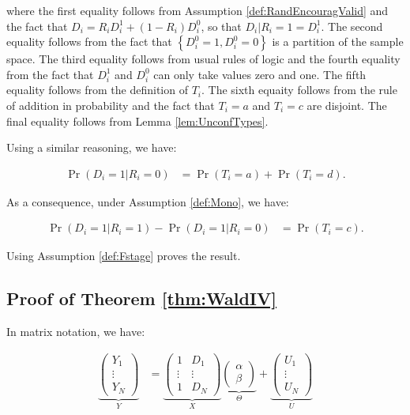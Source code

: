 \documentclass[]{book}
\theoremstyle{definition}
\theoremstyle{definition}
\theoremstyle{definition}
\theoremstyle{remark}
\begin{document}
where the first equality follows from Assumption \ref{def:RandEncouragValid} and the fact that \(D_i=R_iD_i^1+(1-R_i)D_i^0\), so that \(D_i|R_i=1=D_i^1\).
The second equality follows from the fact that \(\left\{ D_i^0=1,D_i^0=0\right\}\) is a partition of the sample space.
The third equality follows from usual rules of logic and the fourth equality from the fact that \(D_i^1\) and \(D_i^0\) can only take values zero and one.
The fifth equality follows from the definition of \(T_i\).
The sixth equaity follows from the rule of addition in probability and the fact that \(T_i=a\) and \(T_i=c\) are disjoint.
The final equality follows from Lemma \ref{lem:UnconfTypes}.

Using a similar reasoning, we have:

\begin{align*}
\Pr(D_i=1|R_i=0) & = \Pr(T_i=a)+ \Pr(T_i=d).
\end{align*}

As a consequence, under Assumption \ref{def:Mono}, we have:

\begin{align*}
\Pr(D_i=1|R_i=1)-\Pr(D_i=1|R_i=0) & = \Pr(T_i=c).
\end{align*}

Using Assumption \ref{def:Fstage} proves the result.

\hypertarget{proofWaldIV}{%
\subsection{Proof of Theorem \ref{thm:WaldIV}}\label{proofWaldIV}}

In matrix notation, we have:

\begin{align*}
  \underbrace{\left(\begin{array}{c}  Y_1 \\    \vdots \\   Y_N \end{array}\right)}_{Y} & =
  \underbrace{\left(\begin{array}{cc}   1 & D_1\\   \vdots & \vdots\\   1 & D_N\end{array}\right)}_{X}
  \underbrace{\left(\begin{array}{c}    \alpha \\   \beta \end{array}\right)}_{\Theta}+
  \underbrace{\left(\begin{array}{c}    U_1 \\  \vdots \\   U_N \end{array}\right)}_{U}
\end{align*}
\end{document}

